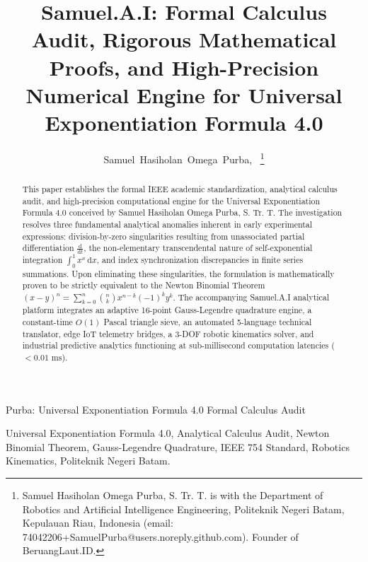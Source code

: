 \documentclass[journal]{IEEEtran}
\begin{document}
\title{Samuel.A.I: Formal Calculus Audit, Rigorous Mathematical Proofs, and High-Precision Numerical Engine for Universal Exponentiation Formula 4.0}

\author{Samuel~Hasiholan~Omega~Purba,~%
\thanks{Samuel Hasiholan Omega Purba, S. Tr. T. is with the Department of Robotics and Artificial Intelligence Engineering, Politeknik Negeri Batam, Kepulauan Riau, Indonesia (email: 74042206+SamuelPurba@users.noreply.github.com). Founder of BeruangLaut.ID.}%
}

%
{Purba: Universal Exponentiation Formula 4.0 Formal Calculus Audit}

\maketitle

\begin{abstract}
This paper establishes the formal IEEE academic standardization, analytical calculus audit, and high-precision computational engine for the Universal Exponentiation Formula 4.0 conceived by Samuel Hasiholan Omega Purba, S. Tr. T. The investigation resolves three fundamental analytical anomalies inherent in early experimental expressions: division-by-zero singularities resulting from unassociated partial differentiation $\frac{\mathrm{d}}{\mathrm{d}t}$, the non-elementary transcendental nature of self-exponential integration $\int_{0}^{1} x^x \, \mathrm{d}x$, and index synchronization discrepancies in finite series summations. Upon eliminating these singularities, the formulation is mathematically proven to be strictly equivalent to the Newton Binomial Theorem $(x-y)^n = \sum_{k=0}^n \binom{n}{k} x^{n-k} (-1)^k y^k$. The accompanying Samuel.A.I analytical platform integrates an adaptive 16-point Gauss-Legendre quadrature engine, a constant-time $O(1)$ Pascal triangle sieve, an automated 5-language technical translator, edge IoT telemetry bridges, a 3-DOF robotic kinematics solver, and industrial predictive analytics functioning at sub-millisecond computation latencies ($<0.01\text{ ms}$).
\end{abstract}

\begin{IEEEkeywords}
Universal Exponentiation Formula 4.0, Analytical Calculus Audit, Newton Binomial Theorem, Gauss-Legendre Quadrature, IEEE 754 Standard, Robotics Kinematics, Politeknik Negeri Batam.
\end{IEEEkeywords}
\end{document}
